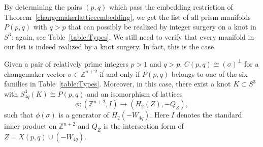By determining the pairs $(p,q)$ which pass the embedding restriction of Theorem~\ref{changemakerlatticeembedding}, we get the list of all prism manifolds $P(p,q)$ with $q>p$ that can possibly be realized by integer surgery on a knot in $S^3$: again, see Table~\ref{table:Types}. We still need to verify that every manifold in our list is indeed realized by a knot surgery. In fact, this is the case.
\begin{theorem}\label{thm:lattice}
Given a pair of relatively prime integers $p>1$ and $q>p$,
$C(p,q)\cong(\sigma)^{\perp}$ for a changemaker vector $\sigma\in\mathbb Z^{n+2}$ if and only if $P(p,q)$ belongs to one of the six families in Table~\ref{table:Types}. Moreover, in this case, there exist a knot $K\subset S^3$ with $S^3_{4q}(K) \cong P(p,q)$ and an isomorphism of lattices
\[\phi: (\mathbb Z^{n+2},I)\to (H_2(Z),-Q_Z),\]
such that $\phi(\sigma)$ is a generator of $H_2(-W_{4q})$. Here $I$ denotes the standard inner product on $\mathbb Z^{n+2}$ and $Q_Z$ is the intersection form of $Z= X(p,q) \cup (-W_{4q})$.
\end{theorem}

